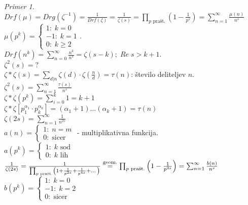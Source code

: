 \documentclass[a4paper, 12pt]{book}
\theoremstyle{definition}
\theoremstyle{remark}
\newtheorem*{ex}{Primer}
\begin{document}
\begin{ex} \text{} \\
  $Drf(\mu) = Drg(\zeta^{-1}) = \frac{1}{Drf(\zeta)} = \frac{1}{\zeta(s)} =
  \prod_{p \text{ prašt.}} \left(1 - \frac{1}{p^s}\right) = \sum_{n=1}^{\infty} \frac{\mu(n)}{n^s}$ \\
  $\mu\left(p^k\right) = \begin{cases}
    1: \; k = 0 \\
    -1: \; k = 1 \\
    0: \; k \geq 2
  \end{cases}$. \\
  $Drf\left(n^k\right) = \sum_{n=0}^{\infty} \frac{n^k}{n^s} = \zeta(s-k); \; Re \; s > k+1$. \\
  $\zeta^2(s) = ?$ \\
  $\zeta * \zeta(s) = \sum_{d | n} \zeta(d) \cdot \zeta\left(\frac{n}{d}\right) = \tau(n)$: število deliteljev $n$. \\
  $\zeta^2(s) = \sum_{n=1}^{\infty} \frac{\tau(s)}{n^s}$ \\
  $\zeta * \zeta(p^k) = \sum_{i=0}^{k} 1 = k+1$ \\
  $\zeta * \zeta\left[p_1^{\alpha_1} \cdot p_k^{\alpha_k}\right] = (\alpha_1 + 1) \dots (\alpha_k + 1) = \tau(n)$ \\
  $\zeta(2s) = \sum_{n=1}^{\infty} \frac{1}{n^{2s}}$ \\
  $a(n) = \begin{cases}
    1: \; n = m \\
    0: \; \text{sicer}
  \end{cases}$ - multiplikativna funkcija. \\
  $a(p^k) = \begin{cases}
    1: \; k \text{ sod} \\
    0: \; k \text{ lih}
  \end{cases}$ \\
  $\frac{1}{\zeta(2s)} = \frac{1}{\prod_{p \text{ prašt.}} \left(1 + \frac{1}{p^{2s}} + \frac{1}{p^{4s}} + \dots\right)} \\
  \stackrel{\text{geom.}}{=} \prod_{p \text{ prašt.}} \left(1 - \frac{1}{p^{2s}}\right)
  = \sum_{n=1}^{\infty} \frac{b(n)}{n^s}$ \\
  $b(p^k) = \begin{cases}
    1: \; k = 0 \\
    -1: \; k = 2 \\
    0: \; \text{sicer}
  \end{cases}$ \\

\end{ex}
\end{document}
